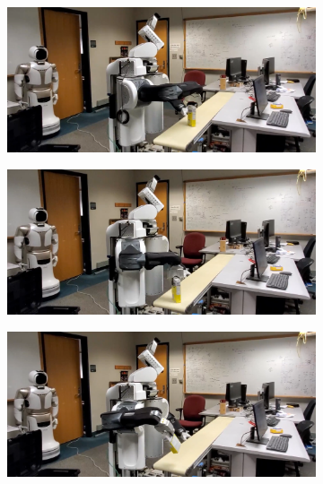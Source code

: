 \documentclass[a4paper]{report}
\begin{document}
\begin{figure}[t]
\begin{subfigure}{0.48\textwidth}
        \caption{}
        \label{fig:demo3}
    \end{subfigure}
    \begin{subfigure}{0.48\textwidth}
        \includegraphics[trim=0 0 400 0, clip, width=\textwidth]{4}
        \caption{}
        \label{fig:demo4}
    \end{subfigure}
    \hspace{2mm}
    \begin{subfigure}{0.48\textwidth}
        \includegraphics[trim=0 0 400 0, clip, width=\textwidth]{5}
        \caption{}
        \label{fig:demo5}
    \end{subfigure}
    \hspace{2mm}
    \begin{subfigure}{0.48\textwidth}
        \includegraphics[trim=0 0 400 0, clip, width=\textwidth]{6}

\end{subfigure}
\end{figure}
\end{document}
